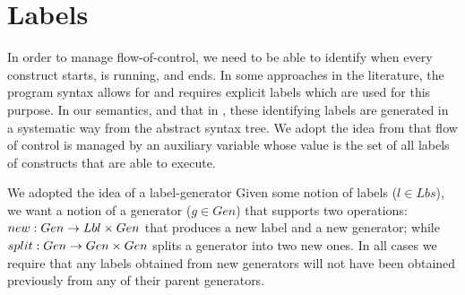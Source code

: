 \section{Labels}\label{sec:labels}

In order to manage flow-of-control,
we need to be able to identify when every construct starts,
is running, and ends.
In some approaches in the literature, the program syntax
allows for and requires explicit labels which are used for this purpose.
In our semantics, and that in \cite{DBLP:journals/cacm/Lamport15a},
these identifying labels are generated in a systematic way from
the abstract syntax tree.
We adopt the idea from \cite{DBLP:conf/icfem/WoodcockH02} that flow of control is managed by an auxiliary variable whose value is the
set of all labels of constructs that are able to execute.


We adopted the idea of a label-generator
Given some notion of labels ($l \in Lbs$),
we want a notion of a generator ($g \in Gen$) that supports two operations:
$new:Gen \rightarrow Lbl \times Gen$ that produces a new label and a new generator;
while
$split:Gen \rightarrow Gen \times Gen$ splits a generator into two new ones.
In all cases we require that any labels obtained from new generators
will not have been obtained previously from any of their parent generators.

